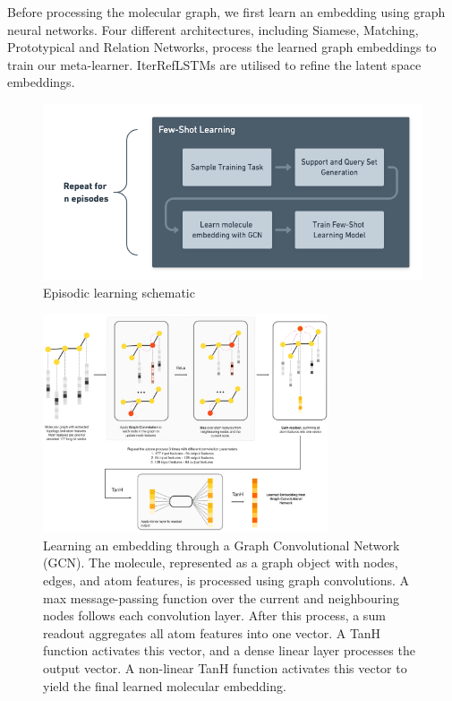 Before processing the molecular graph, we first learn an embedding using graph neural networks. Four different architectures, including Siamese, Matching, Prototypical and Relation Networks, process the learned graph embeddings to train our meta-learner. IterRefLSTMs are utilised to refine the latent space embeddings.
\begin{figure}[h]
	\centering
	\includegraphics[width=0.9\linewidth]{img/episodic-learning.png}
	\caption{Episodic learning schematic}
	\label{fig:episodiclearning}
\end{figure}

\begin{figure}
	\centering
	\includegraphics[width=0.75\textwidth]{img/DVGCNArchi.png}
	\caption{Learning an embedding through a Graph Convolutional Network (GCN). The molecule, represented as a graph object with nodes, edges, and atom features, is processed using graph convolutions. A max message-passing function over the current and neighbouring nodes follows each convolution layer. After this process, a sum readout aggregates all atom features into one vector. A TanH function activates this vector, and a dense linear layer processes the output vector. A non-linear TanH function activates this vector to yield the final learned molecular embedding.}
	\label{fig:dvgcnarchi}
\end{figure}

